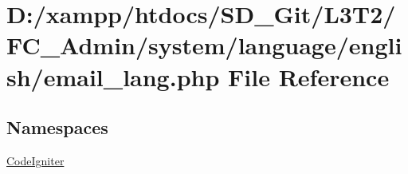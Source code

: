 \hypertarget{email__lang_8php}{}\section{D\+:/xampp/htdocs/\+S\+D\+\_\+\+Git/\+L3\+T2/\+F\+C\+\_\+\+Admin/system/language/english/email\+\_\+lang.php File Reference}
\label{email__lang_8php}
\subsection*{Namespaces}
\begin{DoxyCompactItemize}
\item 
 \hyperlink{namespace_code_igniter}{Code\+Igniter}
\end{DoxyCompactItemize}
